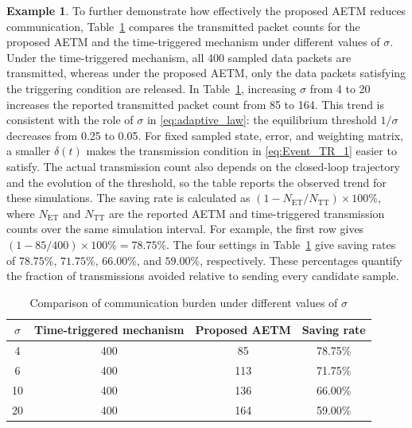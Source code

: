 \documentclass[preprint,review,fleqn,sort&compress,3p]{elsarticle}
\theoremstyle{definition} %
\theoremstyle{definition}%
\newtheorem{example}{Example}
\begin{document}
\begin{example}
To further demonstrate how effectively the proposed AETM reduces communication,
Table~\ref{tab:sigma_effect} compares the transmitted packet counts for the proposed AETM and the time-triggered mechanism under different values of $\sigma$.
Under the time-triggered mechanism, all 400 sampled data packets are transmitted, whereas under the proposed AETM, only the data packets satisfying the triggering condition are released.
In Table~\ref{tab:sigma_effect}, increasing $\sigma$ from 4 to 20 increases the reported transmitted packet count from 85 to 164. This trend is consistent with the role of $\sigma$ in \eqref{eq:adaptive_law}: the equilibrium threshold $1/\sigma$ decreases from 0.25 to 0.05. For fixed sampled state, error, and weighting matrix, a smaller $\delta(t)$ makes the transmission condition in \eqref{eq:Event_TR_1} easier to satisfy. The actual transmission count also depends on the closed-loop trajectory and the evolution of the threshold, so the table reports the observed trend for these simulations.
The saving rate is calculated as $(1-N_{\mathrm{ET}}/N_{\mathrm{TT}})\times100\%$, where $N_{\mathrm{ET}}$ and $N_{\mathrm{TT}}$ are the reported AETM and time-triggered transmission counts over the same simulation interval. For example, the first row gives $(1-85/400)\times100\%=78.75\%$. The four settings in Table~\ref{tab:sigma_effect} give saving rates of $78.75\%$, $71.75\%$, $66.00\%$, and $59.00\%$, respectively. These percentages quantify the fraction of transmissions avoided relative to sending every candidate sample.
\begin{table}[htbp]
	\centering
	\caption{Comparison of communication burden under different values of $\sigma$}
	\label{tab:sigma_effect}
	\begin{tabular}{cccc}
		\toprule
		$\sigma$ & Time-triggered mechanism & Proposed AETM & Saving rate \\
		\midrule
		4  & 400 & 85  & 78.75\% \\
		6  & 400 & 113 & 71.75\% \\
		10 & 400 & 136 & 66.00\% \\
		20 & 400 & 164 & 59.00\% \\
		\bottomrule
	\end{tabular}
\end{table}


\end{example}
\end{document}
